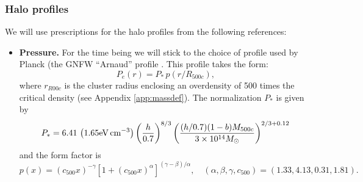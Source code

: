 \documentclass{article}
\begin{document}
    \subsubsection{Halo profiles}
      We will use prescriptions for the halo profiles from the following references:
      \begin{itemize}
        \item {\bf Pressure.} For the time being we will stick to the choice of profile used by Planck (the GNFW ``Arnaud'' profile \cite{2010A&A...517A..92A,2016A&A...594A..24P}. This profile takes the form:
              \begin{equation}
                P_e(r)=P_*\,p(r/R_{500c}),
              \end{equation}
              where $r_{R00c}$ is the cluster radius enclosing an overdensity of 500 times the critical density (see Appendix \ref{app:massdef}). The normalization $P_*$ is given by
              \begin{equation}
                P_*=6.41\,\left(1.65 {\rm eV}\,{\rm cm}^{-3}\right)\left(\frac{h}{0.7}\right)^{8/3}\left(\frac{(h/0.7)(1-b)M_{500c}}{3\times10^{14}M_\odot}\right)^{2/3+0.12}
              \end{equation}
              and the form factor is
              \begin{equation}
                p(x)=(c_{500}x)^{-\gamma}\left[1+(c_{500}x)^\alpha\right]^{(\gamma-\beta)/\alpha},\hspace{12pt}(\alpha,\beta,\gamma,c_{500})=(1.33,4.13,0.31,1.81).
              \end{equation}
              

\end{itemize}
\end{document}
